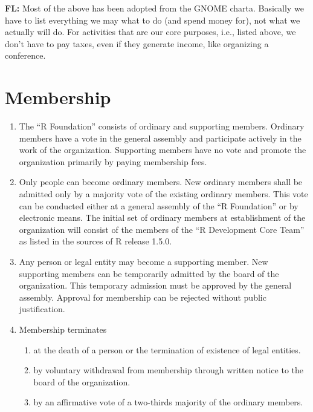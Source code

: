 \documentclass[a4paper]{article}
\newcommand{\note}[2]{{\it \par\noindent\textbf{#1:} #2}}
\newcommand{\RF}{``R Foundation''}
\begin{document}
\note{FL}{Most of the above has been adopted from the GNOME charta.
  Basically we have to list everything we may what to do (and spend
  money for), not what we actually will do. For activities that are
  our core purposes, i.e., listed above, we don't have to pay taxes,
  even if they generate income, like organizing a conference.}

\section{Membership}

\begin{enumerate}
 \item The \RF{} consists of ordinary and supporting
  members.  Ordinary members have a vote in the general assembly and
  participate actively in the work of the organization. Supporting
  members have no vote and promote the organization primarily by
  paying membership fees.
  
 \item Only people can become ordinary members. New ordinary
  members shall be admitted only by a majority vote of the existing
  ordinary members. This vote can be conducted either at a general
  assembly of the \RF{} or by electronic means.  The
  initial set of ordinary members at establishment of the organization
  will consist of the members of the ``R Development Core Team'' as
  listed in the sources of R release 1.5.0.
  
 \item Any person or legal entity may become a supporting member.  New
  supporting members can be temporarily admitted by the board of the
  organization.  This temporary admission must be approved by the
  general assembly.  Approval for membership can be rejected without
  public justification.

 \item Membership terminates
  \begin{enumerate}
   \item at the death of a person or the termination of
    existence of legal entities.
   \item by voluntary withdrawal from membership through written
    notice to the board of the organization.
   \item by an affirmative vote of a two-thirds majority of the
    ordinary members. 
  \end{enumerate}
\end{enumerate}
   
\end{document}
